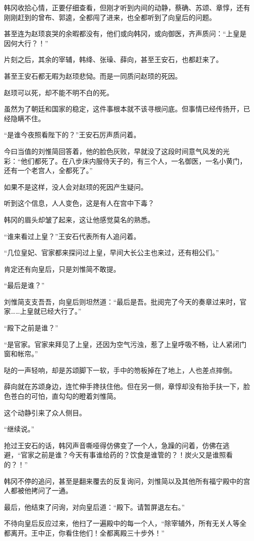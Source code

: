 韩冈收拾心情，正要仔细查看，但刚才听到内间的动静，蔡确、苏颂、章惇，还有刚刚赶到的曾布、郭逵，全都闯了进来，也全都听到了向皇后的问题。

甚至连为赵顼哀哭的余暇都没有，他们或向韩冈，或向御医，齐声质问：“上皇是因何大行？！”

片刻之后，其余的宰辅，韩绛、张璪、薛向，甚至王安石，也都赶来了。

甚至王安石都无暇为赵顼悲恸。而是一同质问赵顼的死因。

赵顼可以死，却不能不明不白的死。

虽然为了朝廷和国家的稳定，这件事根本就不该寻根问底。但事情已经传扬开，已经隐瞒不住。

“是谁今夜照看陛下的？”王安石厉声质问着。

今曰当值的刘惟简回答着，他的脸色灰败，早就没了这段时间意气风发的光彩：“他们都死了。在八步床内服侍天子的，有三个人，一名御医，一名小黄门，还有一个老宫人，全都死了。”

如果不是这样，没人会对赵顼的死因产生疑问。

听到这个信息，人人变色，这是有人在宫中下毒？

韩冈的眉头却皱了起来，这让他感觉莫名的熟悉。

“谁来看过上皇？”王安石代表所有人追问着。

“几位皇妃、官家都来探问过上皇，早间大长公主也来过，还有相公们。”

肯定还有向皇后，只是刘惟简不敢提。

“最后是谁？”

刘惟简支支吾吾，向皇后则坦然道：“最后是吾。批阅完了今天的奏章过来时，官家……上皇就已经大行了。”

“殿下之前是谁？”

“是官家。官家来拜见了上皇，还因为空气污浊，惹了上皇呼吸不畅，让人紧闭门窗和帐帘。”

哒的一声轻响，却是苏颂脚下一软，手中的笏板掉在了地上，人也差点摔倒。

薛向就在苏颂身边，连忙伸手搀扶住他。但在另一侧，章惇却没有抬手扶一下，脸色苍白的可怕，直勾勾的瞪着刘惟简。

这个动静引来了众人侧目。

“继续说。”

抢过王安石的话，韩冈声音嘶哑得仿佛变了一个人，急躁的问着，仿佛在逃避，“官家之前是谁？今天有事谁给药的？饮食是谁管的？！炭火又是谁照看的？！”

韩冈不停的追问，甚至是翻来覆去的反复询问，刘惟简以及其他所有福宁殿中的宫人都被他拷问了一通。

最后，他结束了问询，对向皇后道：“殿下。请暂屏退左右。”

不待向皇后反应过来，他扫了一遍殿中的每一个人，“除宰辅外，所有无关人等全都离开。王中正，你看住他们！全都离殿三十步外！”

